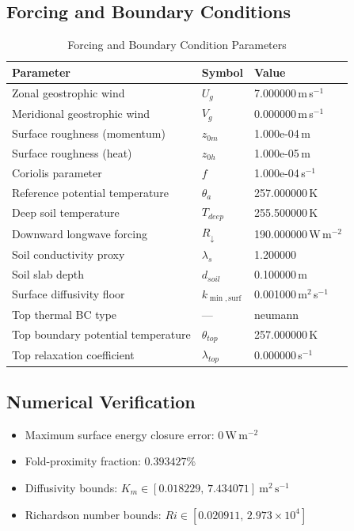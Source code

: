 \subsection{Forcing and Boundary Conditions}
\begin{table}[htbp]
\centering
\caption{Forcing and Boundary Condition Parameters}
\label{tab:scm_parameters_sheba_high_top_sheba_250x2m_12h_report}
\begin{tabular}{lll}
\hline
{\bfseries Parameter} & {\bfseries Symbol} & {\bfseries Value} \\
\hline
Zonal geostrophic wind & $U_g$ & 7.000000\,m\,s$^{-1}$ \\
Meridional geostrophic wind & $V_g$ & 0.000000\,m\,s$^{-1}$ \\
Surface roughness (momentum) & $z_{0m}$ & 1.000e-04\,m \\
Surface roughness (heat) & $z_{0h}$ & 1.000e-05\,m \\
Coriolis parameter & $f$ & 1.000e-04\,s$^{-1}$ \\
Reference potential temperature & $\theta_a$ & 257.000000\,K \\
Deep soil temperature & $T_{deep}$ & 255.500000\,K \\
Downward longwave forcing & $R_{\downarrow}$ & 190.000000\,W\,m$^{-2}$ \\
Soil conductivity proxy & $\lambda_s$ & 1.200000 \\
Soil slab depth & $d_{soil}$ & 0.100000\,m \\
Surface diffusivity floor & $k_{\min,\mathrm{surf}}$ & 0.001000\,m$^2$\,s$^{-1}$ \\
Top thermal BC type & --- & neumann \\
Top boundary potential temperature & $\theta_{top}$ & 257.000000\,K \\
Top relaxation coefficient & $\lambda_{top}$ & 0.000000\,s$^{-1}$ \\
\hline
\end{tabular}
\end{table}

\subsection{Numerical Verification}
\begin{itemize}
  \item Maximum surface energy closure error:
  $0\,\mathrm{W\,m^{-2}}$
  \item Fold-proximity fraction:
  $0.393427\%$
  \item Diffusivity bounds:
  $K_m \in [0.018229,\,7.434071]~\mathrm{m^2\,s^{-1}}$
  \item Richardson number bounds:
  $Ri \in [0.020911,\,2.973 \times 10^{4}]$
\end{itemize}

